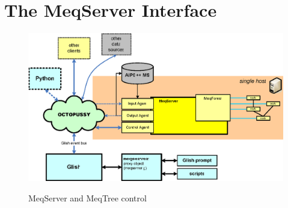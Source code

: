 \chapter{The MeqServer Interface}
\label{chap:meqserver}
\label{sec:meqserver}
\label{sec:meqforest}


  
  
  \begin{figure}[th]
  \begin{center}
  \includegraphics[width=.92\textwidth]{Figures/MeqServer.eps}\\
  \end{center}
  \caption{\label{fig:meqserver}MeqServer and MeqTree control}
  \end{figure}
